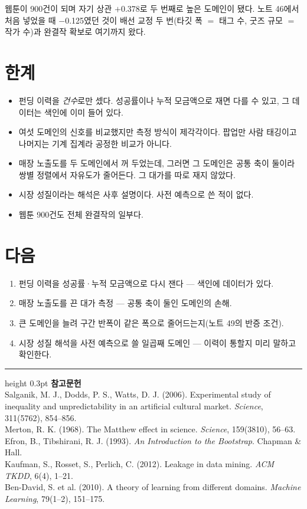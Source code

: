 \documentclass[10pt]{article}
\begin{document}
웹툰이 900건이 되며 자기 상관 $+$0.378로 두 번째로 높은 도메인이 됐다. 노트
46에서 처음 넣었을 때 $-$0.125였던 것이 배선 교정 두 번(타깃 폭 $=$ 태그 수,
굿즈 규모 $=$ 작가 수)과 완결작 확보로 여기까지 왔다.

\section{한계}

\begin{itemize}[leftmargin=1.1em,itemsep=0.15em]
\item 펀딩 이력을 \emph{건수}로만 셌다. 성공률이나 누적 모금액으로 재면 다를 수
      있고, 그 데이터는 색인에 이미 들어 있다.
\item 여섯 도메인의 신호를 비교했지만 측정 방식이 제각각이다. 팝업만 사람
      태깅이고 나머지는 기계 집계라 공정한 비교가 아니다.
\item 매장 노출도를 두 도메인에서 꺼 두었는데, 그러면 그 도메인은 공통 축이
      둘이라 쌍별 정렬에서 자유도가 줄어든다. 그 대가를 따로 재지 않았다.
\item 시장 성질이라는 해석은 사후 설명이다. 사전 예측으로 쓴 적이 없다.
\item 웹툰 900건도 전체 완결작의 일부다.
\end{itemize}

\section{다음}

\begin{enumerate}[leftmargin=1.3em,itemsep=0.15em]
\item 펀딩 이력을 성공률·누적 모금액으로 다시 잰다 --- 색인에 데이터가 있다.
\item 매장 노출도를 끈 대가 측정 --- 공통 축이 둘인 도메인의 손해.
\item 큰 도메인을 늘려 구간 반폭이 같은 폭으로 줄어드는지(노트 49의 반증 조건).
\item 시장 성질 해석을 사전 예측으로 쓸 일곱째 도메인 --- 이력이 통할지
      미리 말하고 확인한다.
\end{enumerate}

\vspace{0.6em}
\hrule height 0.3pt
\vspace{0.5em}
{\footnotesize
\textbf{참고문헌}\\[0.3em]
Salganik, M. J., Dodds, P. S., Watts, D. J. (2006). Experimental study of
inequality and unpredictability in an artificial cultural market.
\emph{Science}, 311(5762), 854--856.\\[0.15em]
Merton, R. K. (1968). The Matthew effect in science. \emph{Science},
159(3810), 56--63.\\[0.15em]
Efron, B., Tibshirani, R. J. (1993). \emph{An Introduction to the Bootstrap}.
Chapman \& Hall.\\[0.15em]
Kaufman, S., Rosset, S., Perlich, C. (2012). Leakage in data mining.
\emph{ACM TKDD}, 6(4), 1--21.\\[0.15em]
Ben-David, S. et al. (2010). A theory of learning from different domains.
\emph{Machine Learning}, 79(1--2), 151--175.
}
\end{document}
